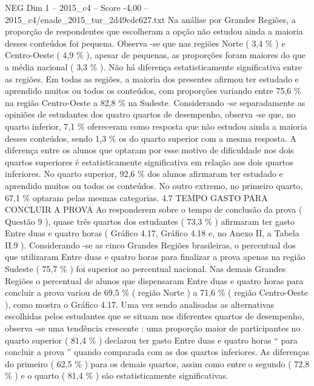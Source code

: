 \begin{textsample}{NEG Dim 1 – 2015\_c4 – Score -4.00 – 2015\_c4/enade\_2015\_tur\_2d49cdc627.txt}
Na análise por Grandes Regiões, a proporção de respondentes que escolheram a opção não estudou ainda a maioria desses conteúdos foi pequena.
Observa -se que nas regiões Norte ( 3,4 \% ) e Centro-Oeste ( 4,9 \% ), apesar de pequenas, as proporções foram maiores do que a média nacional ( 3,3 \% ).
Não há diferença estatisticamente significativa entre as regiões.
Em todas as regiões, a maioria dos presentes afirmou ter estudado e aprendido muitos ou todos os conteúdos, com proporções variando entre 75,6 \% na região Centro-Oeste a 82,8 \% na Sudeste.
Considerando -se separadamente as opiniões de estudantes dos quatro quartos de desempenho, observa -se que, no quarto inferior, 7,1 \% ofereceram como resposta que não estudou ainda a maioria desses conteúdos, sendo 1,3 \% os do quarto superior com a mesma resposta.
A diferença entre os alunos que optaram por esse motivo de dificuldade nos dois quartos superiores é estatisticamente significativa em relação aos dois quartos inferiores.
No quarto superior, 92,6 \% dos alunos afirmaram ter estudado e aprendido muitos ou todos os conteúdos.
No outro extremo, no primeiro quarto, 67,1 \% optaram pelas mesmas categorias. 4.7 TEMPO GASTO PARA CONCLUIR A PROVA Ao responderem sobre o tempo de conclusão da prova ( Questão 9 ), quase três quartos dos estudantes ( 73,3 \% ) afirmaram ter gasto Entre duas e quatro horas ( Gráfico 4.17, Gráfico 4.18 e, no Anexo II, a Tabela II.9 ).
Considerando -se as cinco Grandes Regiões brasileiras, o percentual dos que utilizaram Entre duas e quatro horas para finalizar a prova apenas na região Sudeste ( 75,7 \% ) foi superior ao percentual nacional.
Nas demais Grandes Regiões o percentual de alunos que dispensaram Entre duas e quatro horas para concluir a prova variou de 69,5 \% ( região Norte ) a 71,6 \% ( região Centro-Oeste ), como mostra o Gráfico 4.17.
Uma vez sendo analisadas as alternativas escolhidas pelos estudantes que se situam nos diferentes quartos de desempenho, observa -se uma tendência crescente : uma proporção maior de participantes no quarto superior ( 81,4 \% ) declarou ter gasto Entre duas e quatro horas “ para concluir a prova ” quando comparada com as dos quartos inferiores.
As diferenças do primeiro ( 62,5 \% ) para os demais quartos, assim como entre o segundo ( 72,8 \% ) e o quarto ( 81,4 \% ) são estatisticamente significativas.

\end{textsample}
